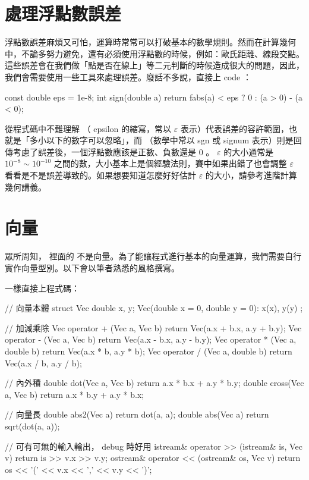 \documentclass[main.tex]{subfiles}
\begin{document}
\section{處理浮點數誤差}

浮點數誤差麻煩又可怕，運算時常常可以打破基本的數學規則\footnotemark。然而在計算幾何中，不論多努力避免，還有必須使用浮點數的時候，例如：歐氏距離、線段交點。這些誤差會在我們做「點是否在線上」等二元判斷的時候造成很大的問題，因此，我們會需要使用一些工具來處理誤差。廢話不多說，直接上 code ：

\begin{C++}
const double eps = 1e-8;
int sign(double a) { return fabs(a) < eps ? 0 : (a > 0) - (a < 0); }
\end{C++}

從程式碼中不難理解  （ epsilon 的縮寫，常以 $\varepsilon$ 表示）代表誤差的容許範圍，也就是「多小以下的數字可以忽略」，而  （數學中常以 sgn 或 signum 表示）則是回傳考慮了誤差後，一個浮點數應該是正數、負數還是 0 。
$\varepsilon$ 的大小通常是 $10^{-8} \sim 10^{-10}$ 之間的數，大小基本上是個經驗法則，賽中如果出錯了也會調整 $\varepsilon$ 看看是不是誤差導致的。如果想要知道怎麼好好估計 $\varepsilon$ 的大小，請參考進階計算幾何講義。


\section{向量}

眾所周知，  裡面的  不是向量\footnotemark。為了能讓程式進行基本的向量運算，我們需要自行實作向量型別。以下會以筆者熟悉的風格撰寫。


一樣直接上程式碼：

\begin{C++}
// 向量本體
struct Vec {
	double x, y;
	Vec(double x = 0, double y = 0): x(x), y(y) {}
};

// 加減乘除
Vec operator + (Vec a, Vec b)
{ return Vec(a.x + b.x, a.y + b.y); }
Vec operator - (Vec a, Vec b)
{ return Vec(a.x - b.x, a.y - b.y); }
Vec operator * (Vec a, double b)
{ return Vec(a.x * b, a.y * b); }
Vec operator / (Vec a, double b)
{ return Vec(a.x / b, a.y / b); }

// 內外積
double dot(Vec a, Vec b)
{ return a.x * b.x + a.y * b.y; }
double cross(Vec a, Vec b)
{ return a.x * b.y + a.y * b.x; }

// 向量長
double abs2(Vec a)
{ return dot(a, a); }
double abs(Vec a)
{ return sqrt(dot(a, a)); }

// 可有可無的輸入輸出， debug 時好用
istream& operator >> (istream& is, Vec v)
{ return is >> v.x >> v.y; }
ostream& operator << (ostream& os, Vec v)
{ return os << '(' << v.x << ',' << v.y << ')'; }
\end{C++}
\end{document}
